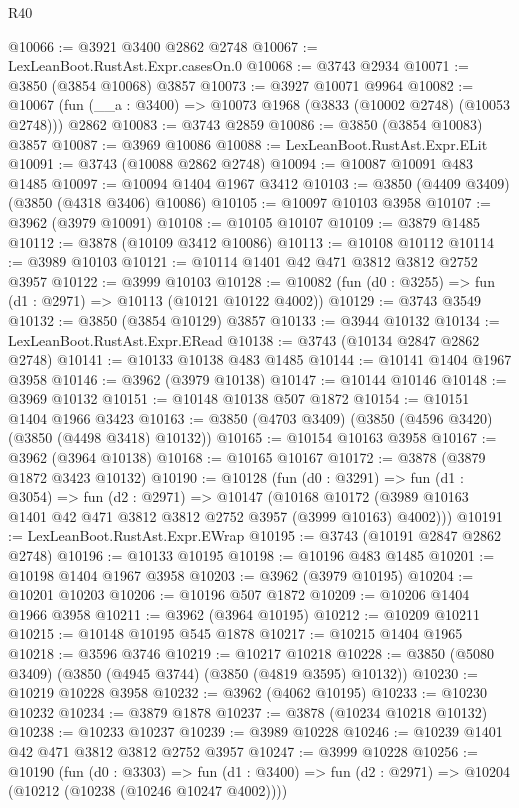 \begin{lexlean}{R40}
\begin{coremodule}
@10066 := @3921 @3400 @2862 @2748
@10067 := LexLeanBoot.RustAst.Expr.casesOn.{0}
@10068 := @3743 @2934
@10071 := @3850 (@3854 @10068) @3857
@10073 := @3927 @10071 @9964
@10082 := @10067 (fun (__a : @3400) => @10073 @1968 (@3833 (@10002 @2748) (@10053 @2748))) @2862
@10083 := @3743 @2859
@10086 := @3850 (@3854 @10083) @3857
@10087 := @3969 @10086
@10088 := LexLeanBoot.RustAst.Expr.ELit
@10091 := @3743 (@10088 @2862 @2748)
@10094 := @10087 @10091 @483 @1485
@10097 := @10094 @1404 @1967 @3412
@10103 := @3850 (@4409 @3409) (@3850 (@4318 @3406) @10086)
@10105 := @10097 @10103 @3958
@10107 := @3962 (@3979 @10091)
@10108 := @10105 @10107
@10109 := @3879 @1485
@10112 := @3878 (@10109 @3412 @10086)
@10113 := @10108 @10112
@10114 := @3989 @10103
@10121 := @10114 @1401 @42 @471 @3812 @3812 @2752 @3957
@10122 := @3999 @10103
@10128 := @10082 (fun (d0 : @3255) => fun (d1 : @2971) => @10113 (@10121 @10122 @4002))
@10129 := @3743 @3549
@10132 := @3850 (@3854 @10129) @3857
@10133 := @3944 @10132
@10134 := LexLeanBoot.RustAst.Expr.ERead
@10138 := @3743 (@10134 @2847 @2862 @2748)
@10141 := @10133 @10138 @483 @1485
@10144 := @10141 @1404 @1967 @3958
@10146 := @3962 (@3979 @10138)
@10147 := @10144 @10146
@10148 := @3969 @10132
@10151 := @10148 @10138 @507 @1872
@10154 := @10151 @1404 @1966 @3423
@10163 := @3850 (@4703 @3409) (@3850 (@4596 @3420) (@3850 (@4498 @3418) @10132))
@10165 := @10154 @10163 @3958
@10167 := @3962 (@3964 @10138)
@10168 := @10165 @10167
@10172 := @3878 (@3879 @1872 @3423 @10132)
@10190 := @10128
    (fun (d0 : @3291) =>
    fun (d1 : @3054) =>
    fun (d2 : @2971) =>
    @10147
      (@10168 @10172 (@3989 @10163 @1401 @42 @471 @3812 @3812 @2752 @3957 (@3999 @10163) @4002)))
@10191 := LexLeanBoot.RustAst.Expr.EWrap
@10195 := @3743 (@10191 @2847 @2862 @2748)
@10196 := @10133 @10195
@10198 := @10196 @483 @1485
@10201 := @10198 @1404 @1967 @3958
@10203 := @3962 (@3979 @10195)
@10204 := @10201 @10203
@10206 := @10196 @507 @1872
@10209 := @10206 @1404 @1966 @3958
@10211 := @3962 (@3964 @10195)
@10212 := @10209 @10211
@10215 := @10148 @10195 @545 @1878
@10217 := @10215 @1404 @1965
@10218 := @3596 @3746
@10219 := @10217 @10218
@10228 := @3850 (@5080 @3409) (@3850 (@4945 @3744) (@3850 (@4819 @3595) @10132))
@10230 := @10219 @10228 @3958
@10232 := @3962 (@4062 @10195)
@10233 := @10230 @10232
@10234 := @3879 @1878
@10237 := @3878 (@10234 @10218 @10132)
@10238 := @10233 @10237
@10239 := @3989 @10228
@10246 := @10239 @1401 @42 @471 @3812 @3812 @2752 @3957
@10247 := @3999 @10228
@10256 := @10190
    (fun (d0 : @3303) =>
    fun (d1 : @3400) => fun (d2 : @2971) => @10204 (@10212 (@10238 (@10246 @10247 @4002))))

\end{coremodule}
\end{lexlean}
